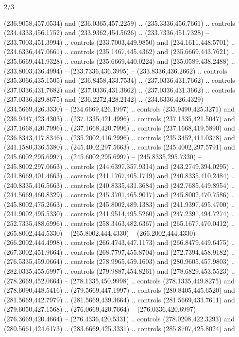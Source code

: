 \begin{flagdescription}{2/3}
\begin{scope}[xshift=0.5\flaglength,yshift=0.5\flagwidth,scale=\flagwidth/525.28]
\begin{scope}[y=0.1mm, x=0.1mm, yscale=-1,shift={(-381.5,-404)}]
\begin{scope}[shift={(5.25001,4.53053)},miter limit=4.00,line width=0.800\lw]
  (236.9058,457.0534) and (236.0365,457.2259) .. (235.3336,456.7661) .. controls
  (234.4333,456.1752) and (233.9362,454.5626) .. (233.7336,451.7328) --
  (233.7003,451.3994) .. controls (233.7003,449.9850) and (234.1611,448.5701) ..
  (234.6336,447.0661) .. controls (235.1467,445.4362) and (235.6669,443.7621) ..
  (235.6669,441.9328) .. controls (235.6669,440.0224) and (235.0589,438.2488) ..
  (233.8003,436.4994) -- (233.7336,436.3995) -- (233.8336,436.2662) .. controls
  (235.3066,435.1505) and (236.8458,433.7534) .. (237.0336,431.7662) .. controls
  (237.0336,431.7682) and (237.0336,431.3662) .. (237.0336,431.3662) .. controls
  (237.0336,429.8675) and (236.2272,428.2142) .. (234.6336,426.4329) --
  (234.5669,426.3330) -- (234.6669,426.1997) .. controls (235.9490,425.3271) and
  (236.9447,423.4303) .. (237.1335,421.4996) .. controls (237.1335,421.5047) and
  (237.1668,420.7996) .. (237.1668,420.7996) .. controls (237.1668,419.5890) and
  (236.8343,417.8346) .. (235.2002,416.2996) .. controls (235.3452,411.0378) and
  (241.1580,336.5380) .. (245.4002,297.5663) .. controls (245.4002,297.5791) and
  (245.6002,295.6997) .. (245.6002,295.6997) -- (245.8335,295.7330) --
  (245.8002,297.0663) .. controls (244.6397,357.9314) and (243.2749,394.0295) ..
  (241.8669,401.4663) .. controls (241.1767,405.1719) and (240.8335,410.2484) ..
  (240.8335,416.5663) .. controls (240.8335,431.3684) and (242.7685,449.8954) ..
  (244.5669,460.8329) .. controls (245.3701,465.9017) and (245.8002,470.7586) ..
  (245.8002,475.2663) .. controls (245.8002,489.1383) and (241.9397,495.4700) ..
  (241.9002,495.5330) .. controls (241.9514,495.5260) and (247.2391,494.7274) ..
  (252.7335,488.6996) .. controls (258.3463,482.6367) and (265.1677,470.0412) ..
  (265.8002,444.5330) -- (265.8002,444.4330) -- (266.2002,444.4330) --
  (266.2002,444.4998) .. controls (266.4743,447.1173) and (266.8479,449.6475) ..
  (267.3002,451.9664) .. controls (268.7797,455.8704) and (272.7394,458.9182) ..
  (276.5335,459.0664) .. controls (278.9965,459.1603) and (280.9605,457.9803) ..
  (282.0335,455.6997) .. controls (279.9887,454.8261) and (278.6829,453.5523) ..
  (278.2669,452.0664) -- (278.1335,450.9998) .. controls (278.1335,449.8275) and
  (278.6090,448.5416) .. (279.5669,447.1997) .. controls (280.8405,445.6520) and
  (281.5669,442.7979) .. (281.5669,439.3664) .. controls (281.5669,433.7611) and
  (279.6050,427.1568) .. (276.0669,420.7664) -- (276.0336,420.6997) --
  (276.3669,420.4664) -- (276.4336,420.5331) .. controls (278.0208,422.3293) and
  (280.5661,424.6173) .. (283.6669,425.3331) .. controls (285.8707,425.8024) and

\end{scope}
\end{scope}
\end{scope}
\end{flagdescription}
